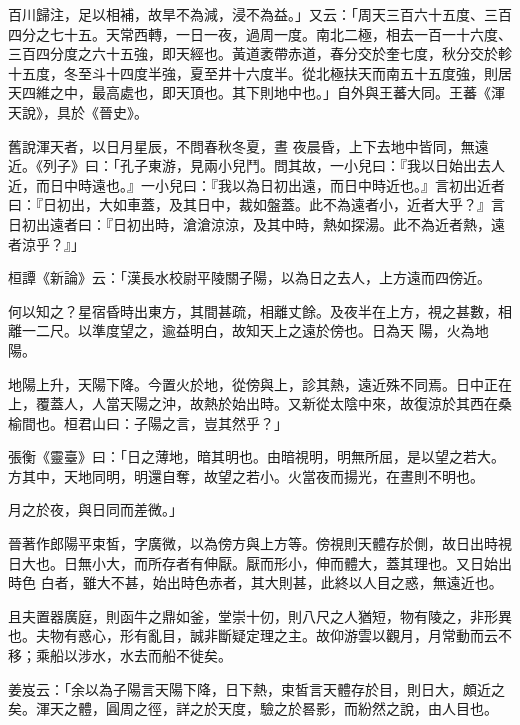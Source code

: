\begin{pinyinscope}
 百川歸注，足以相補，故旱不為減，浸不為益。」又云：「周天三百六十五度、三百四分之七十五。天常西轉，一日一夜，過周一度。南北二極，相去一百一十六度、三百四分度之六十五強，即天經也。黃道袤帶赤道，春分交於奎七度，秋分交於軫十五度，冬至斗十四度半強，夏至井十六度半。從北極扶天而南五十五度強，則居天四維之中，最高處也，即天頂也。其下則地中也。」自外與王蕃大同。王蕃《渾天說》，具於《晉史》。



 舊說渾天者，以日月星辰，不問春秋冬夏，晝
 夜晨昏，上下去地中皆同，無遠近。《列子》曰：「孔子東游，見兩小兒鬥。問其故，一小兒曰：『我以日始出去人近，而日中時遠也。』一小兒曰：『我以為日初出遠，而日中時近也。』言初出近者曰：『日初出，大如車蓋，及其日中，裁如盤蓋。此不為遠者小，近者大乎？』言日初出遠者曰：『日初出時，滄滄涼涼，及其中時，熱如探湯。此不為近者熱，遠者涼乎？』」



 桓譚《新論》云：「漢長水校尉平陵關子陽，以為日之去人，上方遠而四傍近。



 何以知之？星宿昏時出東方，其間甚疏，相離丈餘。及夜半在上方，視之甚數，相離一二尺。以準度望之，逾益明白，故知天上之遠於傍也。日為天
 陽，火為地陽。



 地陽上升，天陽下降。今置火於地，從傍與上，診其熱，遠近殊不同焉。日中正在上，覆蓋人，人當天陽之沖，故熱於始出時。又新從太陰中來，故復涼於其西在桑榆間也。桓君山曰：子陽之言，豈其然乎？」



 張衡《靈臺》曰：「日之薄地，暗其明也。由暗視明，明無所屈，是以望之若大。方其中，天地同明，明還自奪，故望之若小。火當夜而揚光，在晝則不明也。



 月之於夜，與日同而差微。」



 晉著作郎陽平束皙，字廣微，以為傍方與上方等。傍視則天體存於側，故日出時視日大也。日無小大，而所存者有伸厭。厭而形小，伸而體大，蓋其理也。又日始出時色
 白者，雖大不甚，始出時色赤者，其大則甚，此終以人目之惑，無遠近也。



 且夫置器廣庭，則函牛之鼎如釜，堂崇十仞，則八尺之人猶短，物有陵之，非形異也。夫物有惑心，形有亂目，誠非斷疑定理之主。故仰游雲以觀月，月常動而云不移；乘船以涉水，水去而船不徙矣。



 姜岌云：「余以為子陽言天陽下降，日下熱，束皙言天體存於目，則日大，頗近之矣。渾天之體，圓周之徑，詳之於天度，驗之於晷影，而紛然之說，由人目也。




\end{pinyinscope}
